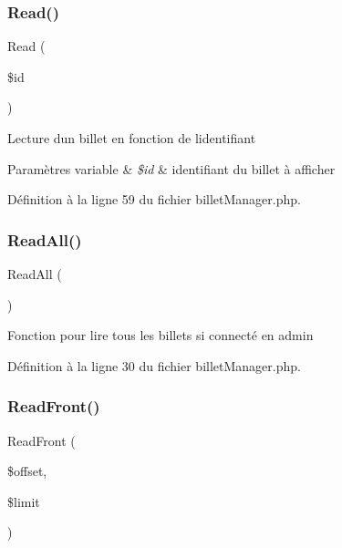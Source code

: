 \subsubsection{\texorpdfstring{Read()}{Read()}}
{\footnotesize\ttfamily Read (\begin{DoxyParamCaption}\item[{}]{\$id }\end{DoxyParamCaption})}

Lecture d\textquotesingle{}un billet en fonction de l\textquotesingle{}identifiant 
\begin{DoxyParams}[1]{Paramètres}
variable & {\em \$id} & identifiant du billet à afficher \\
\hline
\end{DoxyParams}


Définition à la ligne 59 du fichier billet\+Manager.\+php.

\mbox{\label{class_src_1_1_managers_1_1billet_manager_a24f9f6fa83eb8694eab0a87b2e6ad0b1}} 
\subsubsection{\texorpdfstring{Read\+All()}{ReadAll()}}
{\footnotesize\ttfamily Read\+All (\begin{DoxyParamCaption}{ }\end{DoxyParamCaption})}

Fonction pour lire tous les billets si connecté en admin 

Définition à la ligne 30 du fichier billet\+Manager.\+php.

\mbox{\label{class_src_1_1_managers_1_1billet_manager_af7e26a4a8ffd767a1265151f87860ddb}} 
\subsubsection{\texorpdfstring{Read\+Front()}{ReadFront()}}
{\footnotesize\ttfamily Read\+Front (\begin{DoxyParamCaption}\item[{}]{\$offset,  }\item[{}]{\$limit }\end{DoxyParamCaption})}

